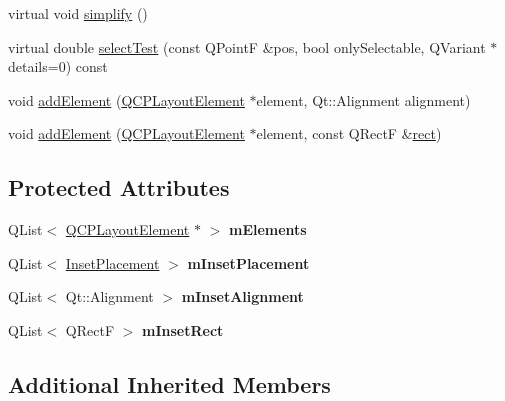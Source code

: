 \begin{DoxyCompactItemize}
\item 
virtual void \hyperlink{class_q_c_p_layout_inset_abb9eb23bf2d7c587a8abe02d065eae0a}{simplify} ()
\item 
virtual double \hyperlink{class_q_c_p_layout_inset_afcd56d5d1b8853838cdc535f1904f68a}{select\+Test} (const Q\+PointF \&pos, bool only\+Selectable, Q\+Variant $\ast$details=0) const
\item 
void \hyperlink{class_q_c_p_layout_inset_ad61529eb576af7f04dff94abb10c745a}{add\+Element} (\hyperlink{class_q_c_p_layout_element}{Q\+C\+P\+Layout\+Element} $\ast$element, Qt\+::\+Alignment alignment)
\item 
void \hyperlink{class_q_c_p_layout_inset_a8ff61fbee4a1f0ff45c398009d9f1e56}{add\+Element} (\hyperlink{class_q_c_p_layout_element}{Q\+C\+P\+Layout\+Element} $\ast$element, const Q\+RectF \&\hyperlink{class_q_c_p_layout_element_a208effccfe2cca4a0eaf9393e60f2dd4}{rect})
\end{DoxyCompactItemize}
\subsection*{Protected Attributes}
\begin{DoxyCompactItemize}
\item 
\hypertarget{class_q_c_p_layout_inset_a8fff7eae9a1be9a5c1e544fb379f682f}{}\label{class_q_c_p_layout_inset_a8fff7eae9a1be9a5c1e544fb379f682f} 
Q\+List$<$ \hyperlink{class_q_c_p_layout_element}{Q\+C\+P\+Layout\+Element} $\ast$ $>$ {\bfseries m\+Elements}
\item 
\hypertarget{class_q_c_p_layout_inset_a57a0a4e445cc78eada29765ecf092abe}{}\label{class_q_c_p_layout_inset_a57a0a4e445cc78eada29765ecf092abe} 
Q\+List$<$ \hyperlink{class_q_c_p_layout_inset_a8b9e17d9a2768293d2a7d72f5e298192}{Inset\+Placement} $>$ {\bfseries m\+Inset\+Placement}
\item 
\hypertarget{class_q_c_p_layout_inset_a55e9b84c310136ff985a6544184ab64a}{}\label{class_q_c_p_layout_inset_a55e9b84c310136ff985a6544184ab64a} 
Q\+List$<$ Qt\+::\+Alignment $>$ {\bfseries m\+Inset\+Alignment}
\item 
\hypertarget{class_q_c_p_layout_inset_aaa8f6b5029458f3d97a65239524a2b33}{}\label{class_q_c_p_layout_inset_aaa8f6b5029458f3d97a65239524a2b33} 
Q\+List$<$ Q\+RectF $>$ {\bfseries m\+Inset\+Rect}
\end{DoxyCompactItemize}
\subsection*{Additional Inherited Members}


